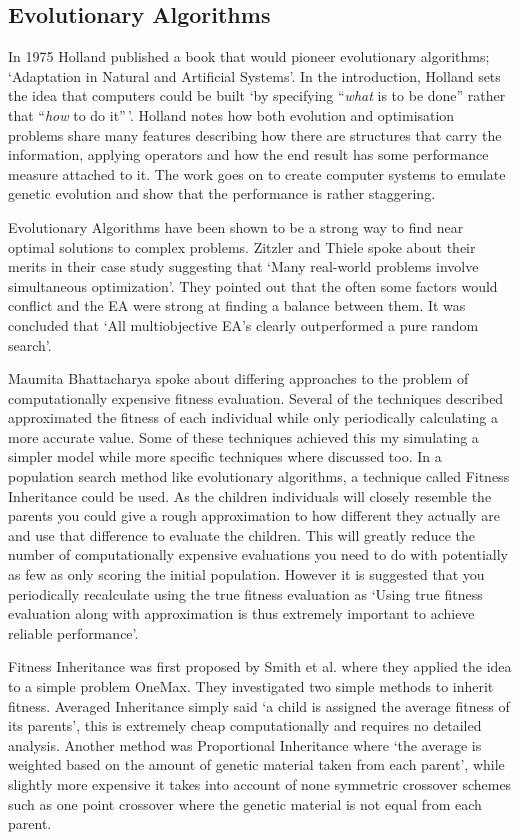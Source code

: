 \documentclass[a4paper]{article}
\begin{document}
\subsection{Evolutionary Algorithms}
\par
In 1975 Holland published a book that would pioneer evolutionary algorithms; `Adaptation in Natural and Artificial Systems'\cite{Holland}.
In the introduction, Holland sets the idea that computers could be built `by specifying ``\emph{what} is to be done'' rather that ``\emph{how} to do it''\,'\cite{Holland}.
Holland notes how both evolution and optimisation problems share many features describing how there are structures that carry the information, applying operators and how the end result has some performance measure attached to it.
The work goes on to create computer systems to emulate genetic evolution and show that the performance is rather staggering.
\\ \par
Evolutionary Algorithms have been shown to be a strong way to find near optimal solutions to complex problems. Zitzler and Thiele spoke about their merits in their case study suggesting that `Many real-world problems involve simultaneous optimization'\cite{EACaseStudy}. They pointed out that the often some factors would conflict and the EA were strong at finding a balance between them. It was concluded that `All multiobjective EA's clearly outperformed a pure random search'\cite{EACaseStudy}.
\par
Maumita Bhattacharya spoke about differing approaches to the problem of computationally expensive fitness evaluation\cite{expensiveOptimisation}.
Several of the techniques described approximated the fitness of each individual while only periodically calculating a more accurate value.
Some of these techniques achieved this my simulating a simpler model while more specific techniques where discussed too.
In a population search method like evolutionary algorithms, a technique called Fitness Inheritance could be used.
As the children individuals will closely resemble the parents you could give a rough approximation to how different they actually are and use that difference to evaluate the children.
This will greatly reduce the number of computationally expensive evaluations you need to do with potentially as few as only scoring the initial population.
However it is suggested that you periodically recalculate using the true fitness evaluation as `Using true fitness evaluation along with approximation is thus extremely important to achieve reliable performance'.
\par
Fitness Inheritance was first proposed by Smith et al.\cite{fitnessInheritance} where they applied the idea to a simple problem OneMax.
They investigated two simple methods to inherit fitness.
Averaged Inheritance simply said `a child is assigned the average fitness of its parents', this is extremely cheap computationally and requires no detailed analysis.
Another method was Proportional Inheritance where `the average is weighted based on the amount of genetic material taken from each parent', while slightly more expensive it takes into account of none symmetric crossover schemes such as one point crossover where the genetic material is not equal from each parent.
\end{document}
